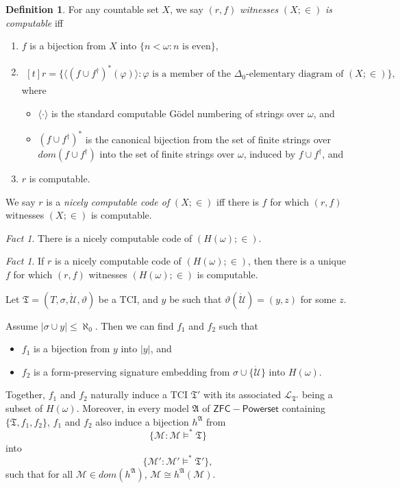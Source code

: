 \documentclass[12pt, twoside]{memoir}
\numberwithin{equation}{section}
\theoremstyle{definition}
\newtheorem{defi}[thm]{Definition}
\theoremstyle{remark}
\newtheorem{fact}[thm]{Fact}
\theoremstyle{definition}
\theoremstyle{definition}
\theoremstyle{definition}
\theoremstyle{remark}
\begin{document}
\begin{defi}
For any countable set $X$, we say $(r, f)$ \emph{witnesses} $(X; \in)$ \emph{is computable} iff
\begin{enumerate}[label=(\alph*)] 
    \item $f$ is a bijection from $X$ into $\{n < \omega : n \text{ is even}\}$,
    \item
    \!
    $\begin{aligned}[t]
        r = \{\langle (f \cup f^{\dagger})^*(\varphi) \rangle : \varphi \text{ is a member of the } \Delta_0 \text{-elementary diagram of } (X; \in)\}, 
    \end{aligned}$
    \medskip
    \\
    where 
    \begin{itemize}
        \item $\langle \cdot \rangle$ is the standard computable G\"odel numbering of strings over $\omega$, and
        \item $(f \cup f^{\dagger})^*$ is the canonical bijection from the set of finite strings over $dom(f \cup f^{\dagger})$ into the set of finite strings over $\omega$, induced by $f \cup f^{\dagger}$, and
    \end{itemize}
    \item $r$ is computable.
\end{enumerate}
We say $r$ is a \emph{nicely computable code of} $(X; \in)$ iff there is $f$ for which $(r, f)$ witnesses $(X; \in)$ is computable.
\end{defi}

\begin{fact}
There is a nicely computable code of $(H(\omega); \in)$. 
\end{fact}

\begin{fact}\label{uniquecode}
If $r$ is a nicely computable code of $(H(\omega); \in)$, then there is a unique $f$ for which $(r, f)$ witnesses $(H(\omega); \in)$ is computable.
\end{fact}

Let $\mathfrak{T} = (T, \sigma, \dot{\mathcal{U}}, \vartheta)$ be a TCI, and $y$ be such that $\vartheta(\dot{\mathcal{U}}) = (y, z)$ for some $z$.

Assume $|\sigma \cup y| \leq \aleph_0$. Then we can find $f_1$ and $f_2$ such that
\begin{itemize}
    \item $f_1$ is a bijection from $y$ into $|y|$, and
    \item $f_2$ is a form-preserving signature embedding from $\sigma \cup \{\dot{\mathcal{U}}\}$ into $H(\omega)$.
\end{itemize}
Together, $f_1$ and $f_2$ naturally induce a TCI $\mathfrak{T}'$ with its associated $\mathcal{L}_{\mathfrak{T}'}$ being a subset of $H(\omega)$. Moreover, in every model $\mathfrak{A}$ of $\mathsf{ZFC - Powerset}$ containing $\{\mathfrak{T}, f_1, f_2\}$, $f_1$ and $f_2$ also induce a bijection $h^{\mathfrak{A}}$ from $$\{\mathcal{M} : \mathcal{M} \models^* \mathfrak{T}\}$$ into $$\{\mathcal{M}' : \mathcal{M}' \models^* \mathfrak{T}'\},$$ such that for all $\mathcal{M} \in dom(h^{\mathfrak{A}})$, $\mathcal{M} \cong h^{\mathfrak{A}}(\mathcal{M})$. 
\end{document}
